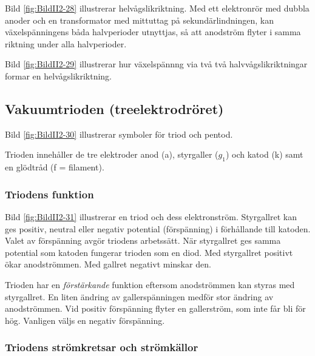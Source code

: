 Bild \ref{fig:BildII2-28} illustrerar helvågslikriktning.
Med ett el\-ek\-tron\-rör med dubbla anoder och en transformator med mittuttag på
sekundärlindningen, kan växelspänningens båda halvperioder utnyttjas, så att
anodström flyter i samma riktning under alla halvperioder.


Bild \ref{fig:BildII2-29} illustrerar hur växelspännng via två
två halvvågslikriktningar formar en helvågslikriktning.

\subsection{Vakuumtrioden (treelektrodröret)}

Bild \ref{fig:BildII2-30} illustrerar symboler för triod och pentod.

Trioden innehåller de tre elektroder anod (a), styrgaller (\(g_1\)) och katod
(k) samt en glödtråd (f = filament).

\subsubsection{Triodens funktion}

Bild \ref{fig:BildII2-31} illustrerar en triod och dess elektronström.
Styrgallret kan ges positiv, neutral eller negativ potential (förspänning) i
förhållande till katoden.
Valet av förspänning avgör triodens arbetssätt.
När styrgallret ges samma potential som katoden fungerar trioden som en diod.
Med styrgallret positivt ökar anodströmmen.
Med gallret negativt minskar den.

Trioden har en \emph{förstärkande} funktion eftersom anodströmmen kan styras med
styrgallret. En liten ändring av gallerspänningen medför stor ändring av anodströmmen.
Vid positiv förspänning flyter en gallerström, som inte får bli för hög.
Vanligen väljs en negativ förspänning.

\subsubsection{Triodens strömkretsar och strömkällor}

